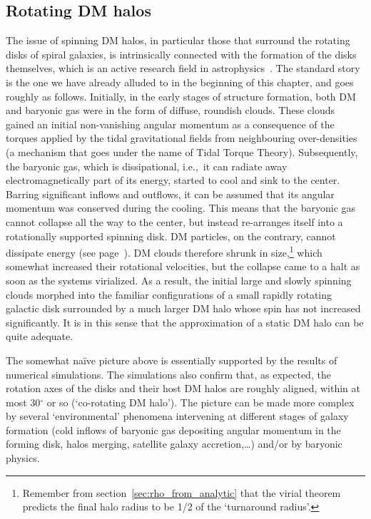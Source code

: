 \subsection{Rotating DM halos} \label{sec:halocorotation} 
The issue of spinning DM halos, in particular those that surround the rotating disks of spiral galaxies, is intrinsically connected with the formation of the disks themselves, which is an active research field in astrophysics~\cite{books_galaxy_formation,corotation}. The standard story is the one we have already alluded to in the beginning of this chapter, and goes roughly as follows. Initially, in the early stages of structure formation, both DM and baryonic gas were in the form of diffuse, roundish clouds. These clouds gained an initial non-vanishing angular momentum as a consequence of the torques applied by the tidal gravitational fields from neighbouring over-densities (a mechanism that goes under the name of Tidal Torque Theory). Subsequently, the baryonic gas, which is dissipational, i.e.,~it can radiate away electromagnetically part of its energy, started to cool and sink to the center. Barring significant inflows and outflows, it can be assumed that its angular momentum was conserved during the cooling. This means that the baryonic gas cannot collapse all the way to the center, but instead re-arranges itself into a rotationally supported spinning disk.  
DM particles, on the contrary, cannot dissipate energy (see page~\pageref{dissipationless}). DM clouds therefore shrunk in size,\footnote{Remember from section~\ref{sec:rho_from_analytic} that the virial theorem predicts the final halo radius to be 1/2 of the `turnaround radius'.} which somewhat increased their rotational velocities, but the collapse came to a halt as soon as the systems virialized.
As a result, the initial large and slowly spinning clouds morphed into the familiar configurations of a small rapidly rotating galactic disk surrounded by a much larger DM halo whose spin has not increased significantly. It is in this sense that the approximation of a static DM halo can be quite adequate.

The somewhat na\"ive picture above is essentially supported by the results of numerical simulations. The simulations also confirm that, as expected, the rotation axes of the disks and their host DM halos are roughly aligned, within at most 30$^\circ$ or so (`co-rotating DM halo'). The picture can be made more complex by several `environmental' phenomena intervening at different stages of galaxy formation (cold inflows of baryonic gas depositing angular momentum in the forming disk, halos merging, satellite galaxy accretion,\ldots) and/or by baryonic physics.

